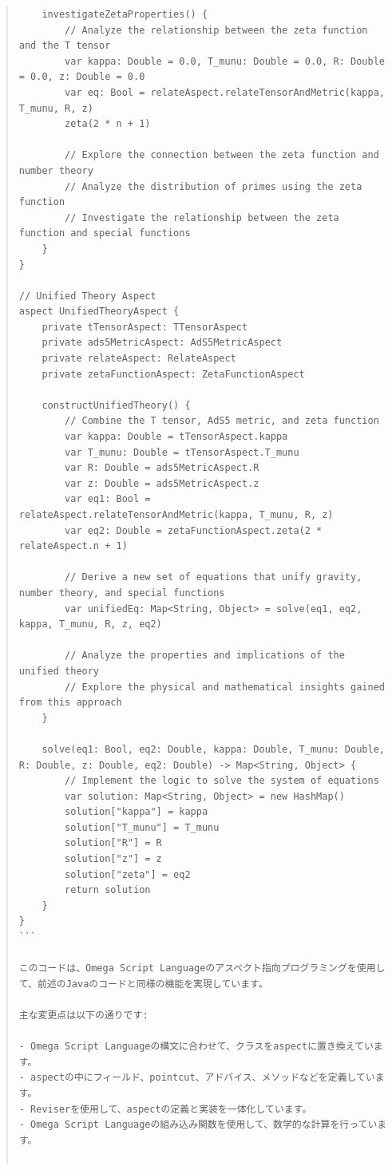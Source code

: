 \documentclass{jsarticle}
\begin{document}
\begin{quote}
\begin{verbatim}
    investigateZetaProperties() {
        // Analyze the relationship between the zeta function and the T tensor
        var kappa: Double = 0.0, T_munu: Double = 0.0, R: Double = 0.0, z: Double = 0.0
        var eq: Bool = relateAspect.relateTensorAndMetric(kappa, T_munu, R, z)
        zeta(2 * n + 1)

        // Explore the connection between the zeta function and number theory
        // Analyze the distribution of primes using the zeta function
        // Investigate the relationship between the zeta function and special functions
    }
}

// Unified Theory Aspect
aspect UnifiedTheoryAspect {
    private tTensorAspect: TTensorAspect
    private ads5MetricAspect: AdS5MetricAspect
    private relateAspect: RelateAspect
    private zetaFunctionAspect: ZetaFunctionAspect

    constructUnifiedTheory() {
        // Combine the T tensor, AdS5 metric, and zeta function
        var kappa: Double = tTensorAspect.kappa
        var T_munu: Double = tTensorAspect.T_munu
        var R: Double = ads5MetricAspect.R
        var z: Double = ads5MetricAspect.z
        var eq1: Bool = relateAspect.relateTensorAndMetric(kappa, T_munu, R, z)
        var eq2: Double = zetaFunctionAspect.zeta(2 * relateAspect.n + 1)

        // Derive a new set of equations that unify gravity, number theory, and special functions
        var unifiedEq: Map<String, Object> = solve(eq1, eq2, kappa, T_munu, R, z, eq2)

        // Analyze the properties and implications of the unified theory
        // Explore the physical and mathematical insights gained from this approach
    }

    solve(eq1: Bool, eq2: Double, kappa: Double, T_munu: Double, R: Double, z: Double, eq2: Double) -> Map<String, Object> {
        // Implement the logic to solve the system of equations
        var solution: Map<String, Object> = new HashMap()
        solution["kappa"] = kappa
        solution["T_munu"] = T_munu
        solution["R"] = R
        solution["z"] = z
        solution["zeta"] = eq2
        return solution
    }
}
```

このコードは、Omega Script Languageのアスペクト指向プログラミングを使用して、前述のJavaのコードと同様の機能を実現しています。

主な変更点は以下の通りです:

- Omega Script Languageの構文に合わせて、クラスをaspectに置き換えています。
- aspectの中にフィールド、pointcut、アドバイス、メソッドなどを定義しています。
- Reviserを使用して、aspectの定義と実装を一体化しています。
- Omega Script Languageの組み込み関数を使用して、数学的な計算を行っています。


\end{verbatim}
\end{quote}
\end{document}
